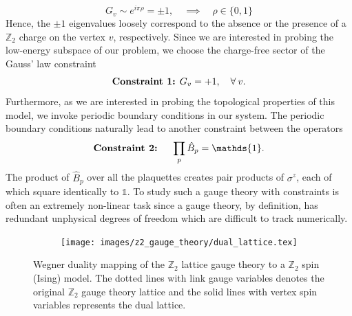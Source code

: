 \documentclass[../thesis_main.tex]{subfiles}
\begin{document}
\begin{equation}
    G_v \sim e^{i \pi \rho} = \pm 1, \quad \implies \quad \rho \in \{0, 1\} 
\end{equation}
Hence, the $\pm 1$ eigenvalues loosely correspond to the absence or the presence of a $\mathbb{Z}_2$ charge on the vertex $v$, respectively. Since we are interested in probing the low-energy subspace of our problem, we choose the charge-free sector of the Gauss' law constraint
\begin{equation}
    \text{\textbf{Constraint 1:} }G_v = + 1, \quad \forall \: v.
    \label{gausslaw}
\end{equation}
Furthermore, as we are interested in probing the topological properties of this model, we invoke periodic boundary conditions in our system. The periodic boundary conditions naturally lead to another constraint between the operators
\begin{equation}
    \text{\textbf{Constraint 2:} } \quad \prod_p \hat{B}_p = \mathds{1}.
    \label{pbc_constraint}
\end{equation}
The product of $\hat{B}_p$ over all the plaquettes creates pair products of $\sigma^z$, each of which square identically to $\mathds{1}$. 
To study such a gauge theory with constraints is often an extremely non-linear task since a gauge theory, by definition, has redundant unphysical degrees of freedom which are difficult to track numerically.
\begin{figure}[t!]
    \centering
    \begin{subfigure}[b]{0.35\textwidth}  %
        \centering
        \texttt{[image: images/z2\_gauge\_theory/dual\_lattice.tex]}
    \end{subfigure}
    \caption{Wegner  duality mapping of the $\mathbb{Z}_2$ lattice gauge theory to a $\mathbb{Z}_2$ spin (Ising) model. The dotted lines with link gauge variables denotes the original $\mathbb{Z}_2$ gauge theory lattice and the solid lines with vertex spin variables represents the dual lattice.}
    \label{dual_lattice}
\end{figure}
\end{document}
